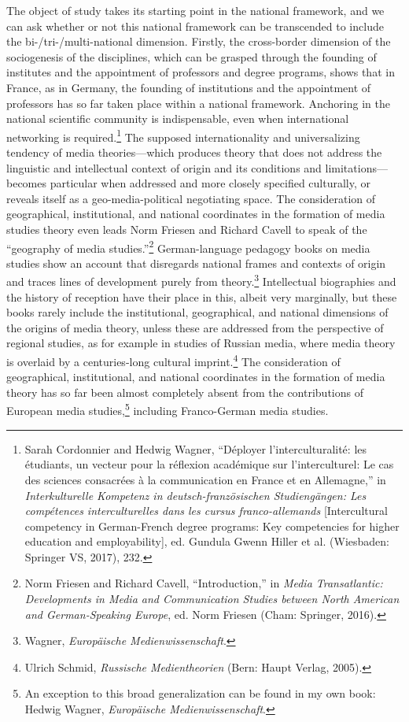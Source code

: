 \documentclass{tufte-handout}
\begin{document}
The object of study takes its starting point in the national framework,
and we can ask whether or not this national framework can be transcended
to include the bi-/tri-/multi-national dimension. Firstly, the
cross-border dimension of the sociogenesis of the disciplines, which can
be grasped through the founding of institutes and the appointment of
professors and degree programs, shows that in France, as in Germany, the
founding of institutions and the appointment of professors has so far
taken place within a national framework. Anchoring in the national
scientific community is indispensable, even when international
networking is required.\footnote{Sarah Cordonnier and Hedwig Wagner,
  ``Déployer l'interculturalité: les étudiants, un vecteur pour la
  réflexion académique sur l'interculturel: Le cas des sciences
  consacrées à la communication en France et en Allemagne,'' in
  \emph{Interkulturelle Kompetenz in deutsch-französischen
  Studiengängen: Les compétences interculturelles dans les cursus
  franco-allemands} {[}Intercultural competency in German-French degree
  programs: Key competencies for higher education and employability{]},
  ed. Gundula Gwenn Hiller et al. (Wiesbaden: Springer VS, 2017), 232.}
The supposed internationality and universalizing tendency of media
theories---which produces theory that does not address the linguistic
and intellectual context of origin and its conditions and
limitations---becomes particular when addressed and more closely
specified culturally, or reveals itself as a geo-media-political
negotiating space. The consideration of geographical, institutional, and
national coordinates in the formation of media studies theory even leads
Norm Friesen and Richard Cavell to speak of the ``geography of media
studies.''\footnote{Norm Friesen and Richard Cavell, ``Introduction,''
  in \emph{Media Transatlantic: Developments in Media and Communication
  Studies between North American and German-Speaking Europe}, ed. Norm
  Friesen (Cham: Springer, 2016).} German-language pedagogy books on
media studies show an account that disregards national frames and
contexts of origin and traces lines of development purely from
theory.\footnote{Wagner, \emph{Europäische Medienwissenschaft}.}
Intellectual biographies and the history of reception have their place
in this, albeit very marginally, but these books rarely include the
institutional, geographical, and national dimensions of the origins of
media theory, unless these are addressed from the perspective of
regional studies, as for example in studies of Russian media, where
media theory is overlaid by a centuries-long cultural
imprint.\footnote{Ulrich Schmid, \emph{Russische Medientheorien} (Bern:
  Haupt Verlag, 2005).} The consideration of geographical,
institutional, and national coordinates in the formation of media theory
has so far been almost completely absent from the contributions of
European media studies,\footnote{An exception to this broad
  generalization can be found in my own book: Hedwig Wagner,
  \emph{Europäische Medienwissenschaft}.} including Franco-German media
studies.
\end{document}
